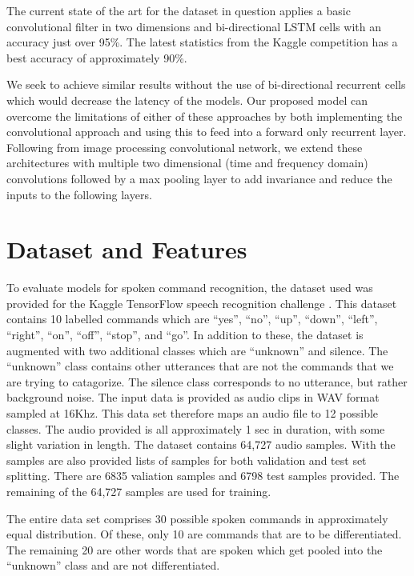 \documentclass{article}
\begin{document}
The current state of the art for the dataset in question applies a
basic convolutional filter in two dimensions and bi-directional LSTM
cells with an accuracy just over 95\%\cite{zhang2017hello}. The latest
statistics from the
Kaggle competition has a best accuracy of approximately
90\%\cite{kaggle}.

We seek to achieve similar results without the use
of bi-directional recurrent cells which would decrease the latency of
the models. Our proposed model can overcome the limitations of either
of these approaches by
both implementing the convolutional approach and using this to feed
into a forward only recurrent layer. Following from image processing
convolutional network, we extend these architectures with multiple two
dimensional (time and frequency domain) convolutions followed by a max
pooling layer to add invariance and reduce the inputs to the following
layers.

\section{Dataset and Features}
To evaluate models for spoken command recognition, the dataset used
was provided for the Kaggle TensorFlow speech recognition
challenge \cite{kaggle, speechcommands}. This dataset contains 10 labelled commands
which are ``yes'', ``no'', ``up'', ``down'', ``left'', ``right'', ``on'', ``off'',
``stop'', and ``go''. In addition to these, the dataset is augmented with
two additional classes which are “unknown” and silence. The “unknown”
class contains other utterances that are not the commands that we are
trying to catagorize. The silence class corresponds to no
utterance, but rather background noise. The input data is provided as
audio clips in WAV format sampled at 16Khz. This data set therefore
maps an audio file to 12 possible classes. The audio provided is all
approximately 1 sec in duration, with some slight variation in
length. The dataset contains 64,727 audio samples. With the samples
are also provided lists of samples for both validation and test set
splitting. There are 6835 valiation samples and 6798 test samples
provided. The remaining of the 64,727 samples are used for training.

The entire data set comprises 30 possible spoken commands in
approximately equal distribution. Of these, only 10 are commands that
are to be differentiated. The remaining 20 are other words that are
spoken which get pooled into the ``unknown'' class and are not
differentiated.
\end{document}

